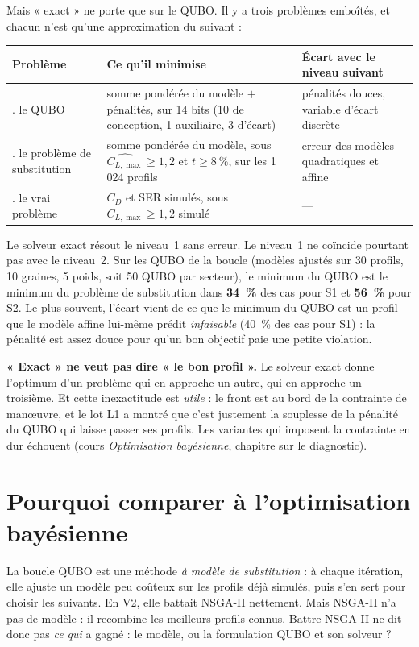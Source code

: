 Mais « exact » ne porte que sur le QUBO. Il y a trois problèmes emboîtés, et chacun n'est qu'une approximation du suivant :
\begin{center}
\renewcommand{\arraystretch}{1.25}
\begin{tabularx}{\linewidth}{>{\raggedright\arraybackslash}p{3.4cm}>{\raggedright\arraybackslash}X>{\raggedright\arraybackslash}p{4.2cm}}
\toprule
Problème & Ce qu'il minimise & Écart avec le niveau suivant \\
\midrule
1. le QUBO & somme pondérée du modèle $+$ pénalités, sur 14 bits (10 de conception, 1 auxiliaire, 3 d'écart) & pénalités douces, variable d'écart discrète \\
2. le problème de substitution & somme pondérée du modèle, sous $\widehat{C_{L,\max}}\ge1{,}2$ et $t\ge8~\%$, sur les 1\,024 profils & erreur des modèles quadratiques et affine \\
3. le vrai problème & $C_D$ et SER simulés, sous $C_{L,\max}\ge1{,}2$ simulé & --- \\
\bottomrule
\end{tabularx}
\end{center}
Le solveur exact résout le niveau~1 sans erreur. Le niveau~1 ne coïncide pourtant pas avec le niveau~2. Sur les QUBO de la boucle (modèles ajustés sur 30 profils, 10 graines, 5 poids, soit 50 QUBO par secteur), le minimum du QUBO est le minimum du problème de substitution dans \textbf{34~\%} des cas pour S1 et \textbf{56~\%} pour S2. Le plus souvent, l'écart vient de ce que le minimum du QUBO est un profil que le modèle affine lui-même prédit \emph{infaisable} (40~\% des cas pour S1) : la pénalité est assez douce pour qu'un bon objectif paie une petite violation.

\begin{piege}
\textbf{« Exact » ne veut pas dire « le bon profil ».} Le solveur exact donne l'optimum d'un problème qui en approche un autre, qui en approche un troisième. Et cette inexactitude est \emph{utile} : le front est au bord de la contrainte de manœuvre, et le lot L1 a montré que c'est justement la souplesse de la pénalité du QUBO qui laisse passer ses profils. Les variantes qui imposent la contrainte en dur échouent (cours \emph{Optimisation bayésienne}, chapitre sur le diagnostic).
\end{piege}

\section{Pourquoi comparer à l'optimisation bayésienne}\label{sec:pourquoi-bayes}
La boucle QUBO est une méthode \emph{à modèle de substitution} : à chaque itération, elle ajuste un modèle peu coûteux sur les profils déjà simulés, puis s'en sert pour choisir les suivants. En V2, elle battait NSGA-II nettement. Mais NSGA-II n'a pas de modèle : il recombine les meilleurs profils connus. Battre NSGA-II ne dit donc pas \emph{ce qui} a gagné : le modèle, ou la formulation QUBO et son solveur ?


